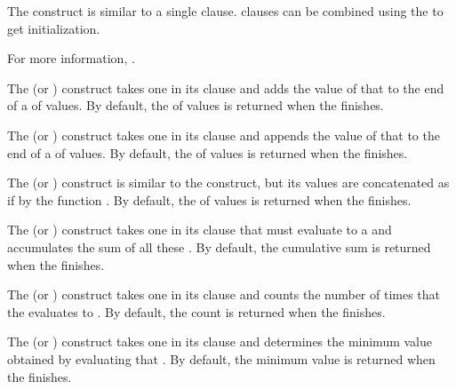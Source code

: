 
The  construct is similar to a single  clause.
 clauses can be combined using the  
to get  initialization.


For more information, \seesection\LOOPVarInitAndStep.

\endsubsubsubsection%

 
The  (or ) construct
takes one  in its clause
and adds the value of that  to the end of a  
of values.  By default, the  of values is returned 
when the  finishes.
 
The  (or ) construct 
takes one  in its clause
and appends the value of that  to the end of a 
of values.  By default, the  of values is returned when the 
 finishes.
 
The  (or ) construct 
is similar to the  construct,  
but its  values are concatenated as if by the function
.  By default, the  of values is returned when 
the  finishes.
 
The  (or ) construct 
takes one  in its clause 
that must evaluate to a  and accumulates the sum of all these
.  By default, the cumulative sum is returned when the
 finishes.
 
The  (or ) construct 
takes one  in its clause 
and counts the number of times that the  evaluates to .
By default, the count is returned when the  finishes.
 
The  (or ) construct
takes one  in its clause 
and determines the minimum value obtained by evaluating that .
By default, the minimum value is returned when the  finishes.
 
